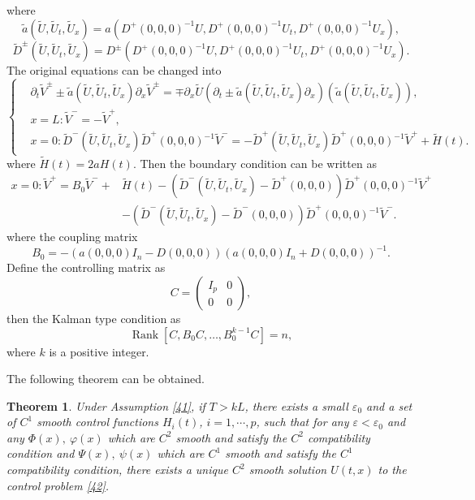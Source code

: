 \documentclass[a4paper,reqno,11pt]{amsart}
\numberwithin{equation}{section} %
\newtheorem{thm}{Theorem}
\begin{document}
where
$$
\tilde{a} \left(\tilde{U} , \tilde{U} _t, \tilde{U} _x\right)=a\left(D^{+}(0,0,0)^{-1} U, D^{+}(0,0,0)^{-1} U_t, D^{+}(0,0,0)^{-1} U_x\right) ,
$$
$$
\tilde{D} ^{\pm}\left(\tilde{U} , \tilde{U} _t, \tilde{U} _x\right)=D^{\pm}\left(D^{+}(0,0,0)^{-1} U, D^{+}(0,0,0)^{-1} U_t, D^{+}(0,0,0)^{-1} U_x\right) .
$$
The original equations can be changed into
\begin{equation}\label{hyperbolic equations}
    \begin{cases}
    & \partial_t \tilde{V} ^{ \pm} \pm \tilde{a} \left(\tilde{U} , \tilde{U} _t, \tilde{U} _x\right) \partial_x \tilde{V} ^{ \pm}=\mp \partial_x \tilde{U} \left(\partial_t \pm \tilde{a} \left(\tilde{U} , \tilde{U} _t, \tilde{U} _x\right) \partial_x\right)\left(\tilde{a} \left(\tilde{U} , \tilde{U} _t, \tilde{U} _x\right)\right) ,\\
    & x=L:\tilde{ V} ^{-}=-\tilde{V} ^{+} ,\\
    & x=0: \tilde{D} ^{-}\left(\tilde{U} , \tilde{U} _t, \tilde{U} _x\right) \tilde{D} ^{+}(0,0,0)^{-1} \tilde{V} ^{-}=-\tilde{D} ^{+}\left(\tilde{U} , \tilde{U} _t, \tilde{U} _x\right) \tilde{D} ^{+}(0,0,0)^{-1} \tilde{V} ^{+}+\tilde{H} (t).
\end{cases}
\end{equation}
where $\tilde{H} (t)=2aH(t)$. Then the boundary condition can be written as
$$
\begin{aligned}
x=0: \widetilde{V}^{+}=B_0 \widetilde{V}^{-}+ & \widetilde{H}(t)-\left(\widetilde{D}^{-}\left(\widetilde{U}, \widetilde{U}_t, \widetilde{U}_x\right)-\widetilde{D}^{+}(0,0,0)\right) \widetilde{D}^{+}(0,0,0)^{-1} \widetilde{V}^{+} \\
& -\left(\widetilde{D}^{-}\left(\widetilde{U}, \widetilde{U}_t, \widetilde{U}_x\right)-\widetilde{D}^{-}(0,0,0)\right) \widetilde{D}^{+}(0,0,0)^{-1} \widetilde{V}^{-}.
\end{aligned}
$$
where the coupling matrix 
$$
B_0=-\left(a(0,0,0) I_n-D(0,0,0)\right)\left(a(0,0,0) I_n+D(0,0,0)\right)^{-1} .
$$
Define the controlling matrix as 
$$
C=\left(\begin{array}{cc}
I_p & 0 \\
0 & 0
\end{array}\right) ,
$$
then the Kalman type condition as
\begin{equation}\label{41}
    \operatorname{Rank}\left[C, B_0 C, \ldots, B_0^{k-1} C\right]=n,
\end{equation}
where $k$ is a positive integer.

The following theorem can be obtained.
\begin{thm} \label{thm:main}
	Under Assumption \eqref{41}, if $T > kL$, there exists a small $\varepsilon _0$ and a set of $C^1$ smooth control functions $H_i(t)$, $i=1,\cdots ,p$, such that for any $\varepsilon < \varepsilon _0 $ and any $\varPhi (x),\ \varphi  (x)$ which are $C^2$ smooth and satisfy the $C^2$ compatibility condition and $\varPsi (x),\ \psi (x)$ which are $C^1$ smooth and satisfy the $C^1$ compatibility condition, there exists a unique $C^2$ smooth solution $U(t,x)$ to the control problem \eqref{42}.
\end{thm}
\end{document}
